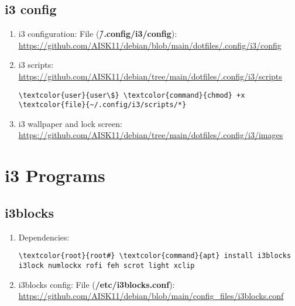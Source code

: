 \documentclass[10pt, a4paper, onecolumn, openany]{book} %
\begin{document}
\section{i3 config}
\begin{enumerate}
    \item i3 configuration:
\newline File (\textbf{\textcolor{file}{\~/.config/i3/config}}):
\newline \underline{\url{https://github.com/AISK11/debian/blob/main/dotfiles/.config/i3/config}}
    \item i3 scripts:
\newline \underline{\url{https://github.com/AISK11/debian/tree/main/dotfiles/.config/i3/scripts}}
\begin{Verbatim}[commandchars=\\\{\}]
\textcolor{user}{user\$} \textcolor{command}{chmod} +x \textcolor{file}{~/.config/i3/scripts/*}
\end{Verbatim}
    \item i3 wallpaper and lock screen:
\newline \underline{\url{https://github.com/AISK11/debian/tree/main/dotfiles/.config/i3/images}}
\end{enumerate}
\chapter{i3 Programs}
\section{i3blocks}
\begin{enumerate}
    \item Dependencies:
\begin{Verbatim}[commandchars=\\\{\}]
\textcolor{root}{root#} \textcolor{command}{apt} install i3blocks i3lock numlockx rofi feh scrot light xclip
\end{Verbatim}
    \item i3blocks config:
\newline File (\textbf{\textcolor{file}{/etc/i3blocks.conf}}):
\newline \underline{\url{https://github.com/AISK11/debian/blob/main/config_files/i3blocks.conf}}
\end{enumerate}
\end{document}
